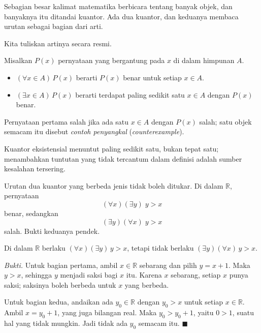 Sebagian besar kalimat matematika berbicara tentang banyak objek, dan banyaknya itu
ditandai kuantor. Ada dua kuantor, dan keduanya membaca urutan sebagai bagian dari arti.


Kita tuliskan artinya secara resmi.

\begin{definisi}
Misalkan $P(x)$ pernyataan yang bergantung pada $x$ di dalam himpunan $A$.
\begin{itemize}
  \item $(\forall x \in A)\,P(x)$ berarti $P(x)$ benar untuk setiap $x \in A$.
  \item $(\exists x \in A)\,P(x)$ berarti terdapat paling sedikit satu $x \in A$
        dengan $P(x)$ benar.
\end{itemize}
Pernyataan pertama salah jika ada satu $x \in A$ dengan $P(x)$ salah; satu objek
semacam itu disebut \emph{contoh penyangkal} (\emph{counterexample}).
\end{definisi}

Kuantor eksistensial menuntut paling sedikit satu, bukan tepat satu; menambahkan tuntutan
yang tidak tercantum dalam definisi adalah sumber kesalahan tersering.

Urutan dua kuantor yang berbeda jenis tidak boleh ditukar. Di dalam $\mathbb{R}$,
pernyataan
\[
  (\forall x)(\exists y)\; y > x
\]
benar, sedangkan
\[
  (\exists y)(\forall x)\; y > x
\]
salah. Bukti keduanya pendek.

\begin{proposisi}
Di dalam $\mathbb{R}$ berlaku $(\forall x)(\exists y)\, y > x$, tetapi tidak berlaku
$(\exists y)(\forall x)\, y > x$.
\end{proposisi}
\par\smallskip\noindent\textit{Bukti.} Untuk bagian pertama, ambil $x \in \mathbb{R}$
sebarang dan pilih $y = x+1$. Maka $y > x$, sehingga $y$ menjadi saksi bagi $x$ itu.
Karena $x$ sebarang, setiap $x$ punya saksi; saksinya boleh berbeda untuk $x$ yang
berbeda.

Untuk bagian kedua, andaikan ada $y_{0} \in \mathbb{R}$ dengan $y_{0} > x$ untuk
setiap $x \in \mathbb{R}$. Ambil $x = y_{0}+1$, yang juga bilangan real. Maka
$y_{0} > y_{0}+1$, yaitu $0 > 1$, suatu hal yang tidak mungkin. Jadi tidak ada $y_{0}$
semacam itu.
\hfill$\blacksquare${\parfillskip=0pt\par}

